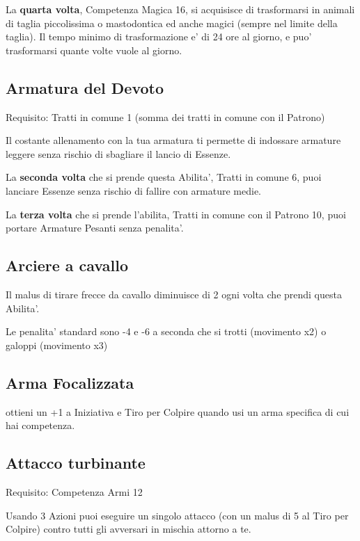 \documentclass[a4paper,11pt,twoside,openany]{dndbook}
\begin{document}
La \textbf{quarta volta}, Competenza Magica 16, si acquisisce di trasformarsi in animali di taglia piccolissima o mastodontica ed anche magici (sempre nel limite della taglia). Il tempo minimo di trasformazione e' di 24 ore al giorno, e puo' trasformarsi quante volte vuole al giorno.

\subsection{Armatura del Devoto}

Requisito: Tratti in comune 1 (somma dei tratti in comune con il Patrono)

Il costante allenamento con la tua armatura ti permette di indossare armature leggere senza rischio di sbagliare il lancio di Essenze.

La \textbf{seconda volta} che si prende questa Abilita', Tratti in comune 6, puoi lanciare Essenze senza rischio di fallire con armature medie.

La \textbf{terza volta} che si prende l'abilita, Tratti in comune con il Patrono 10, puoi portare Armature Pesanti senza penalita'.

\subsection{Arciere a cavallo}

Il malus di tirare frecce da cavallo diminuisce di 2 ogni volta che prendi questa Abilita'.

Le penalita' standard sono -4 e -6 a seconda che si trotti (movimento x2) o galoppi (movimento x3)

\subsection{Arma Focalizzata}

ottieni un +1 a Iniziativa e Tiro per Colpire quando usi un arma specifica
di cui hai competenza.

\subsection{Attacco turbinante}

Requisito: Competenza Armi 12

Usando 3 Azioni puoi eseguire un singolo attacco (con un malus di
5 al Tiro per Colpire) contro tutti gli avversari in mischia attorno
a te.
\end{document}
